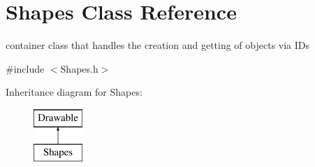 \hypertarget{class_shapes}{}\section{Shapes Class Reference}
\label{class_shapes}


container class that handles the creation and getting of objects via I\+Ds  




{\ttfamily \#include $<$Shapes.\+h$>$}

Inheritance diagram for Shapes\+:\begin{figure}[H]
\begin{center}
\leavevmode
\includegraphics[height=2.000000cm]{class_shapes}
\end{center}
\end{figure}
